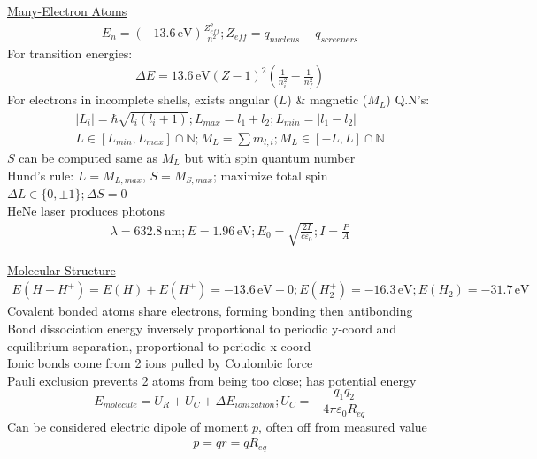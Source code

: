 \documentclass[8pt]{extarticle}
\begin{document}
    \underline{Many-Electron Atoms}
        \begin{gather*}
            E_n = (-13.6\,\unit{\eV})\frac{Z_{eff}^2}{n^2};
            Z_{eff} = q_{nucleus} - q_{screeners}
        \end{gather*}
        For transition energies:
        \begin{gather*}
            \Delta E = 13.6\,\unit{\eV}(Z - 1)^2\left( \frac{1}{n_i^2} - \frac{1}{n_f^2} \right)
        \end{gather*}
        For electrons in incomplete shells, exists angular ($L$) \& magnetic ($M_L$) Q.N's:
        \begin{gather*}
            |L_i| = \hbar\sqrt{l_i(l_i + 1)};
            L_{max} = l_1 + l_2; 
            L_{min} = |l_1 - l_2|\\
            L \in [L_{min}, L_{max}] \cap \mathbb{N};
            M_L = \sum m_{l,i};
            M_L \in [-L, L] \cap \mathbb{N}
        \end{gather*}
        $S$ can be computed same as $M_L$ but with spin quantum number\\
        Hund's rule: $L = M_{L, max}$, $S = M_{S, max}$; maximize total spin\\
        $\Delta L \in \{0, \pm 1\}; \Delta S = 0$\\
        HeNe laser produces photons
        \begin{gather*}
            \lambda = 632.8\,\unit{\nano\meter}; E = 1.96\,\unit{\eV};
            E_0 = \sqrt{\frac{2I}{c\varepsilon_0}}; I = \frac{P}{A}
        \end{gather*} 

    \underline{Molecular Structure}
        \scriptsize
        \begin{gather*}
            E(H + H^+) = E(H) + E(H^+) = -13.6\,\unit{\eV} + 0; 
            E(H_2^+) = -16.3\,\unit{\eV};
            E(H_2) = -31.7\,\unit{\eV}
        \end{gather*}
        \normalsize
        Covalent bonded atoms share electrons, forming bonding then antibonding\\
        Bond dissociation energy inversely proportional to periodic y-coord and equilibrium separation, proportional to periodic x-coord\\
        Ionic bonds come from 2 ions pulled by Coulombic force\\
        Pauli exclusion prevents 2 atoms from being too close; has potential energy
        \begin{equation*}
            E_{molecule} = U_R + U_C + \Delta E_{ionization}; U_C = -\frac{q_1 q_2}{4\pi\varepsilon_0 R_{eq}}
        \end{equation*}
        Can be considered electric dipole of moment $p$, often off from measured value
        \begin{gather*}
            p = qr = qR_{eq}
        \end{gather*}
\end{document}
